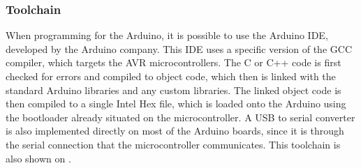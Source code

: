 \subsubsection{Toolchain}
When programming for the Arduino, it is possible to use the Arduino IDE, developed by the Arduino company.
This IDE uses a specific version of the GCC compiler, which targets the AVR microcontrollers.
The C or C++ code is first checked for errors and compiled to object code, which then is linked with the standard Arduino libraries and any custom libraries.
The linked object code is then compiled to a single Intel Hex file, which is loaded onto the Arduino using the bootloader already situated on the microcontroller.
A USB to serial converter is also implemented directly on most of the Arduino boards, since it is through the serial connection that the microcontroller communicates. 
This toolchain is also shown on .\cite{2015ArduinoToolchain}


